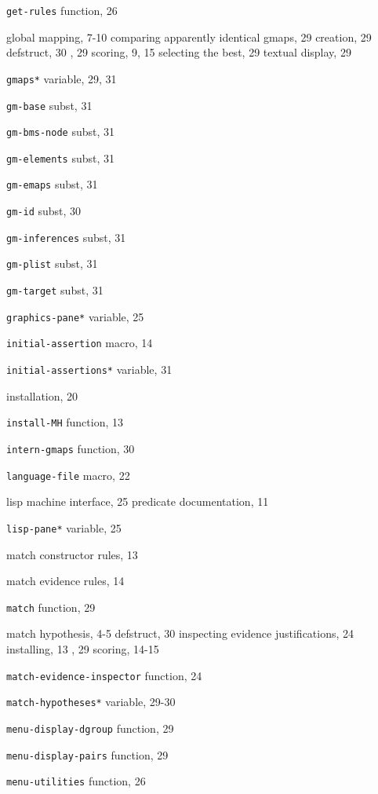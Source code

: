 \begin{theindex}
\item {\tt get-rules} function, 26
\item global mapping, 7-10
	\subitem  comparing apparently identical gmaps, 29
	\subitem  creation, 29
	\subitem  defstruct, 30
	, 29
	\subitem  scoring, 9, 15
	\subitem  selecting the best, 29
	\subitem  textual display, 29
\item {\tt *gmaps*} variable, 29, 31
\item {\tt gm-base} subst, 31
\item {\tt gm-bms-node} subst, 31
\item {\tt gm-elements} subst, 31
\item {\tt gm-emaps} subst, 31
\item {\tt gm-id} subst, 30
\item {\tt gm-inferences} subst, 31
\item {\tt gm-plist} subst, 31
\item {\tt gm-target} subst, 31
\item {\tt *graphics-pane*} variable, 25
\indexspace
\item {\tt initial-assertion} macro, 14
\item {\tt *initial-assertions*} variable, 31
\item installation, 20
\item {\tt install-MH} function, 13
\item {\tt intern-gmaps} function, 30
\indexspace
\item {\tt language-file} macro, 22
\item lisp machine interface, 25
	\subitem  predicate documentation, 11
\item {\tt *lisp-pane*} variable, 25
\indexspace
\item match constructor rules, 13
\item match evidence rules, 14
\item {\tt match} function, 29
\item match hypothesis, 4-5
	\subitem  defstruct, 30
	\subitem  inspecting evidence justifications, 24
	\subitem  installing, 13
	, 29
	\subitem  scoring, 14-15
\item {\tt match-evidence-inspector} function, 24
\item {\tt *match-hypotheses*} variable, 29-30
\item {\tt menu-display-dgroup} function, 29
\item {\tt menu-display-pairs} function, 29
\item {\tt menu-utilities} function, 26

\end{theindex}
